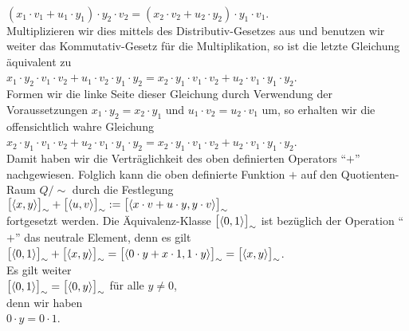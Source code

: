 \\[0.2cm]
\hspace*{1.3cm}
$(x_1 \cdot v_1 + u_1 \cdot y_1) \cdot y_2 \cdot v_2 = 
 (x_2 \cdot v_2 + u_2 \cdot y_2) \cdot y_1 \cdot v_1
$.
\\[0.2cm]
Multiplizieren wir dies mittels des Distributiv-Gesetzes aus und benutzen wir weiter das
Kommutativ-Gesetz f\"{u}r die Multiplikation, so ist die letzte Gleichung \"{a}quivalent zu
\\[0.2cm]
\hspace*{1.3cm}
$x_1 \cdot y_2 \cdot v_1 \cdot v_2 + u_1 \cdot v_2 \cdot y_1 \cdot y_2 = 
 x_2 \cdot y_1 \cdot v_1 \cdot v_2 + u_2 \cdot v_1 \cdot y_1 \cdot y_2
$.
\\[0.2cm]
Formen wir die linke Seite dieser Gleichung durch Verwendung der Voraussetzungen 
$x_1 \cdot y_2 = x_2 \cdot y_1$  und $u_1 \cdot v_2 = u_2 \cdot v_1$ um, so erhalten wir
die offensichtlich wahre Gleichung
\\[0.2cm]
\hspace*{1.3cm}
$x_2 \cdot y_1 \cdot v_1 \cdot v_2 + u_2 \cdot v_1 \cdot y_1 \cdot y_2 = 
 x_2 \cdot y_1 \cdot v_1 \cdot v_2 + u_2 \cdot v_1 \cdot y_1 \cdot y_2
$.
\\[0.2cm]
Damit haben wir die Vertr\"{a}glichkeit des oben definierten Operators ``$+$'' nachgewiesen.
Folglich kann die oben definierte Funktion $+$ auf den Quotienten-Raum $Q/\!\sim$ durch die Festlegung
\\[0.2cm]
\hspace*{1.3cm}
$\bigl[\pair(x,y)\bigr]_\sim + \bigl[\pair(u,v)\bigr]_\sim := 
 \bigl[\pair(x \cdot v + u \cdot y, y \cdot v)\bigr]_\sim
$
\\[0.2cm]
fortgesetzt werden.  Die \"{A}quivalenz-Klasse
$\bigl[\pair(0,1)\bigr]_\sim$
ist bez\"{u}glich der Operation ``$+$'' das neutrale Element, denn es gilt
\\[0.2cm]
\hspace*{1.3cm}
$\bigl[\pair(0,1)\bigr]_\sim + \bigl[\pair(x,y)\bigr]_\sim = 
 \bigl[\pair(0 \cdot y + x \cdot 1, 1 \cdot y)\bigr]_\sim = 
 \bigl[\pair(x, y)\bigr]_\sim
$.
\\[0.2cm]
Es gilt weiter
\\[0.2cm]
\hspace*{1.3cm}
$\bigl[\pair(0,1)\bigr]_\sim = \bigl[\pair(0,y)\bigr]_\sim$ \quad f\"{u}r alle $y \not= 0$,
\\[0.2cm]
denn wir haben
\\[0.2cm]
\hspace*{1.3cm}
$0 \cdot y = 0 \cdot 1$.
